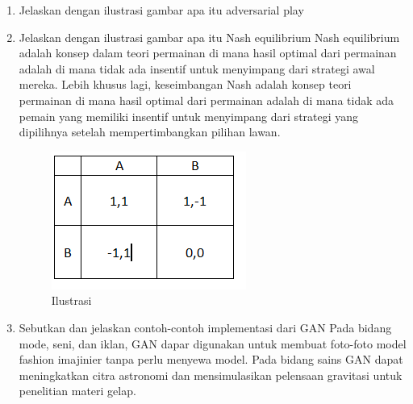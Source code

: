 \begin{enumerate}
\item Jelaskan dengan ilustrasi gambar apa itu adversarial play


\item Jelaskan dengan ilustrasi gambar apa itu Nash equilibrium
Nash equilibrium adalah konsep dalam teori permainan di mana hasil optimal dari permainan adalah di mana tidak ada insentif untuk menyimpang dari strategi awal mereka. Lebih khusus lagi, keseimbangan Nash adalah konsep teori permainan di mana hasil optimal dari permainan adalah di mana tidak ada pemain yang memiliki insentif untuk menyimpang dari strategi yang dipilihnya setelah mempertimbangkan pilihan lawan.
\begin{figure}[ht]
\centering
\includegraphics[scale=0.4]{figures/1174042/chapter8/7.PNG}
\caption{Ilustrasi}
\label{Contoh}
\end{figure}


\item Sebutkan dan jelaskan contoh-contoh implementasi dari GAN
Pada bidang mode, seni, dan iklan, GAN dapar digunakan untuk membuat foto-foto model fashion imajinier tanpa perlu menyewa model. Pada bidang sains GAN dapat meningkatkan citra astronomi dan mensimulasikan pelensaan gravitasi untuk penelitian materi gelap.



\end{enumerate}
